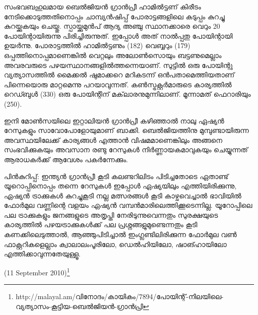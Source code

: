 സംഭവബഹുലമായ ബെല്‍ജിയന്‍ ഗ്രാന്‍പ്രീ ഹാമില്‍ട്ടണ് കിരീടം നേടിക്കൊടുത്തതിനൊപ്പം ചാമ്പ്യന്‍ഷിപ്പ് 
പോരാട്ടങ്ങളിലെ കടുപ്പം കുറച്ചു കുറയ്ക്കുകയും ചെയ്തു. സ്പായ്ക്കുമുന്‍പ് ആദ്യ അഞ്ചു സ്ഥാനക്കാരെ വെറും 20 പോയിന്റായിരുന്നു 
പിരിച്ചിരുന്നുത്. ഇപ്പോള്‍ അത് നാല്‍പ്പതു പോയിന്റായി ഉയര്‍ന്നു. പോരാട്ടത്തില്‍ ഹാമില്‍ട്ടണും (182) വെബ്ബറും (179) 
ഒപ്പത്തിനൊപ്പമാണെങ്കില്‍ വെറ്റലും അലോണ്‍സൊയും ബട്ടണുമെല്ലാം അവരവരുടെ പഴയസ്ഥാനങ്ങളില്‍ത്തന്നെയാണ്.
സുട്ടില്‍ ഒരു പോയിന്റു വ്യത്യാസത്തില്‍ മൈക്കല്‍ ഷുമാക്കറെ മറികടന്ന് ഒന്‍പതാമെത്തിയതാണ് പിന്നെയൊരു 
മാറ്റമെന്നു പറയാവുന്നത്. കണ്‍സ്ട്രക്റ്റര്‍മാരുടെ കാര്യത്തില്‍ റെഡ്ബുള്‍ (330) ഒരു പോയിന്റിന് മക്‌ലാരനുമുന്നിലാണ്. 
മൂന്നാമത് ഫെറാരിയും (250).

ഇനി മോണ്‍സയിലെ ഇറ്റാലിയന്‍ ഗ്രാന്‍പ്രീ കഴിഞ്ഞാല്‍ നാലു ഏഷ്യന്‍ റേസുകളും സാവോപോളോയുമാണ് ബാക്കി. 
ബെല്‍ജിയത്തിനു മുമ്പുണ്ടായിരുന്ന അവസ്ഥയിലേക്ക് കാര്യങ്ങള്‍ എത്താന്‍ വിഷമമാണെങ്കിലും അങ്ങനെ 
സംഭവിക്കുകയും അവസാന രണ്ടു റേസുകള്‍ നിര്‍ണ്ണായകമാവുകയും ചെയ്യുന്നത് ആരാധകര്‍ക്ക് ആവേശം 
പകര്‍ന്നേക്കും.

പിന്‍കുറിപ്പ്: ഇന്ത്യന്‍ ഗ്രാന്‍പ്രീ കൂടി കലണ്ടറിലിടം പിടിച്ചതോടെ ഏതാണ്ട് യൂറൊപ്പിനൊപ്പം തന്നെ റേസുകള്‍ ഇപ്പോള്‍ 
ഏഷ്യയിലും എത്തിയിരിക്കുന്നു, ഏഷ്യന്‍ ട്രാക്കുകള്‍ കുറച്ചുകൂടി നല്ല മത്സരങ്ങള്‍ കൂടി കാഴ്ചവെച്ചാല്‍ ഭാവിയില്‍ ഫോര്‍മുല 
വണ്ണിന്റെ വളയം ഏഷ്യന്‍ വമ്പന്‍മാരിലെത്തിക്കൂടെന്നില്ല. യൂറോപ്പിലെ പല ട്രാക്കുകളും ജനങ്ങളുടെ അതൃപ്തി 
നേരിടുന്നുവെന്നതും സുരക്ഷയുടെ കാര്യത്തില്‍ പഴയട്രാക്കുകള്‍ക്ക് പല പ്രശ്നങ്ങളുമുണ്ടെന്നതും കൂടി കണക്കിലെടുത്താല്‍,
ആഞ്ഞുപിടിച്ചാല്‍ ഇംഗ്ലണ്ടിലിരിക്കുന്ന ഫോര്‍മുല വണ്‍ ഫാക്റ്ററികളെല്ലാം ക്വാലാലംപൂരിലോ, ഡെല്‍ഹിയിലോ, 
ഷാങ്ഹായിലോ എത്തിക്കാവുന്നതേയുള്ളൂ.

(11 September 2010)\footnote{http://malayal.am/വിനോദം/കായികം/7894/പോയിന്റ്-നിലയിലെ-വ്യത്യാസം-കൂട്ടിയ-ബെല്‍ജിയന്‍-ഗ്രാന്‍പ്രി}

\newpage
